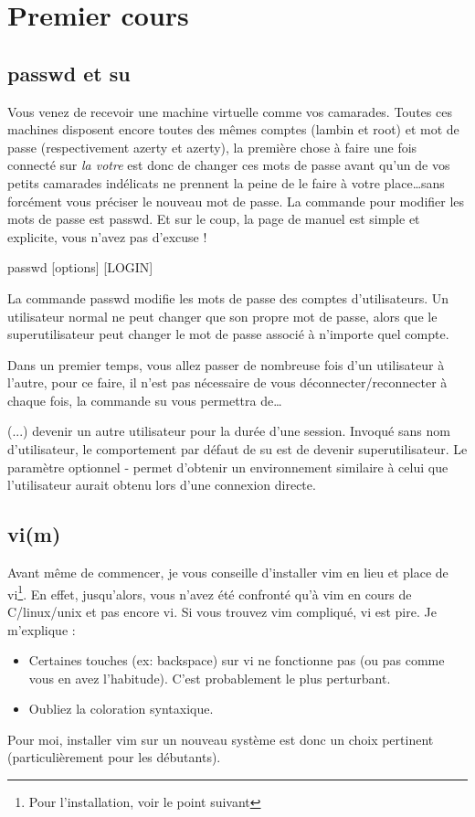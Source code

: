 \documentclass[a4paper]{article}
\newcommand{\man}[2]{
    \begin{tcolorbox}[toprule=3mm,width=\textwidth,outer arc=0mm,colbacktitle=grayman,coltitle=black,colback={grayman},colframe={grayman},title={man : \tt #1}]
        \tt\raggedright #2
    \end{tcolorbox}
}
\newcommand{\mandesc}[1]{
    \begin{adjustwidth}{0.8cm}{}
        #1
    \end{adjustwidth}
}
\begin{document}
\section{Premier cours}
\subsection{passwd et su}
\par Vous venez de recevoir une machine virtuelle comme vos camarades. Toutes ces machines disposent encore toutes des mêmes comptes (lambin et root) et mot de passe (respectivement azerty et azerty), la première chose à faire une fois connecté sur \emph{la votre} est donc de changer ces mots de passe avant qu'un de vos petits camarades indélicats ne prennent la peine de le faire à votre place\ldots sans forcément vous préciser le nouveau mot de passe. La commande pour modifier les mots de passe est passwd. Et sur le coup, la page de manuel est simple et explicite, vous n'avez pas d'excuse !
\man{passwd}{
passwd [options] [LOGIN]
\mandesc{La commande passwd modifie les mots de passe des comptes d'utilisateurs. Un utilisateur normal ne peut changer que son propre mot de passe, alors que le superutilisateur peut changer le mot de passe associé à n'importe quel compte.}
}
\par Dans un premier temps, vous allez passer de nombreuse fois d'un utilisateur à l'autre, pour ce faire, il n'est pas nécessaire de vous déconnecter/reconnecter à chaque fois, la commande su vous permettra de\ldots
\man{su}{
(...) devenir un autre utilisateur pour la durée d'une session. Invoqué sans nom d'utilisateur, le comportement par défaut de su est de devenir superutilisateur. Le paramètre optionnel - permet d'obtenir un environnement similaire à celui que l'utilisateur aurait obtenu lors d'une connexion directe.}

\subsection{vi(m)}
\par Avant même de commencer, je vous conseille d'installer vim en lieu et place de vi\footnote{Pour l'installation, voir le point suivant}. En effet, jusqu'alors, vous n'avez été confronté qu'à vim en cours de C/linux/unix et pas encore vi. Si vous trouvez vim compliqué, vi est pire. Je m'explique :
\begin{itemize}
    \item Certaines touches (ex: backspace) sur vi ne fonctionne pas (ou pas comme vous en avez l'habitude). C'est probablement le plus perturbant.
    \item Oubliez la coloration syntaxique.
\end{itemize}
\par Pour moi, installer vim sur un nouveau système est donc un choix pertinent (particulièrement pour les débutants).
\end{document}
